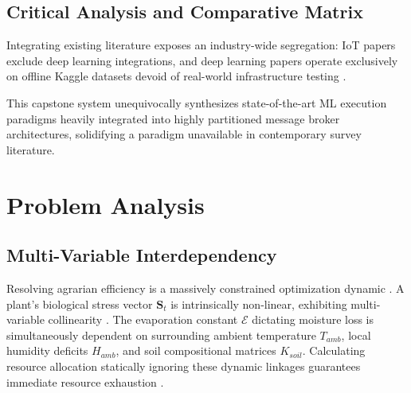 \documentclass[12pt, a4paper]{report}
\begin{document}
\section{Critical Analysis and Comparative Matrix}
Integrating existing literature exposes an industry-wide segregation: IoT papers exclude deep learning integrations, and deep learning papers operate exclusively on offline Kaggle datasets devoid of real-world infrastructure testing \cite{r2}. 

\begin{table}[H]
\centering
\caption{Comprehensive Literature Comparison and Topological Deficits}
\label{tab:lit_compare}
\end{table}

This capstone system unequivocally synthesizes state-of-the-art ML execution paradigms heavily integrated into highly partitioned message broker architectures, solidifying a paradigm unavailable in contemporary survey literature.

\chapter{Problem Analysis}

\section{Multi-Variable Interdependency}
Resolving agrarian efficiency is a massively constrained optimization dynamic \cite{r4}. A plant's biological stress vector $\mathbf{S}_t$ is intrinsically non-linear, exhibiting multi-variable collinearity \cite{r5}. The evaporation constant $\mathcal{E}$ dictating moisture loss is simultaneously dependent on surrounding ambient temperature $T_{amb}$, local humidity deficits $H_{amb}$, and soil compositional matrices $K_{soil}$. Calculating resource allocation statically ignoring these dynamic linkages guarantees immediate resource exhaustion \cite{r6}.
\end{document}
